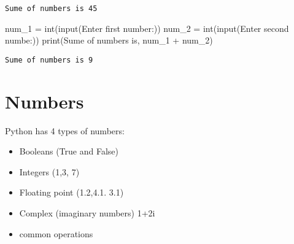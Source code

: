 \documentclass[
  letterpaper,
  DIV=11,
  numbers=noendperiod]{scrreprt}
\newenvironment{Shaded}{\begin{snugshade}}{\end{snugshade}}
\newcommand{\BuiltInTok}[1]{\textcolor[rgb]{0.00,0.46,0.62}{#1}}
\newcommand{\NormalTok}[1]{\textcolor[rgb]{0.00,0.46,0.62}{#1}}
\newcommand{\OperatorTok}[1]{\textcolor[rgb]{0.37,0.37,0.37}{#1}}
\newcommand{\StringTok}[1]{\textcolor[rgb]{0.13,0.47,0.30}{#1}}
\begin{document}
\begin{verbatim}
Sume of numbers is 45
\end{verbatim}

\begin{Shaded}
\begin{Highlighting}[]
\NormalTok{num\_1 }\OperatorTok{=} \BuiltInTok{int}\NormalTok{(}\BuiltInTok{input}\NormalTok{(}\StringTok{\textquotesingle{}Enter first number:\textquotesingle{}}\NormalTok{))}
\NormalTok{num\_2 }\OperatorTok{=} \BuiltInTok{int}\NormalTok{(}\BuiltInTok{input}\NormalTok{(}\StringTok{\textquotesingle{}Enter second numbe:\textquotesingle{}}\NormalTok{))}
\BuiltInTok{print}\NormalTok{(}\StringTok{\textquotesingle{}Sume of numbers is\textquotesingle{}}\NormalTok{, num\_1 }\OperatorTok{+}\NormalTok{ num\_2)}
\end{Highlighting}
\end{Shaded}

\begin{verbatim}
Sume of numbers is 9
\end{verbatim}

\hypertarget{numbers}{%
\section{Numbers}\label{numbers}}

Python has 4 types of numbers:

\begin{itemize}
\item
  Booleans (True and False)
\item
  Integers (1,3, 7)
\item
  Floating point (1.2,4.1. 3.1)
\item
  Complex (imaginary numbers) 1+2i
\item
  common operations
\end{itemize}
\end{document}
